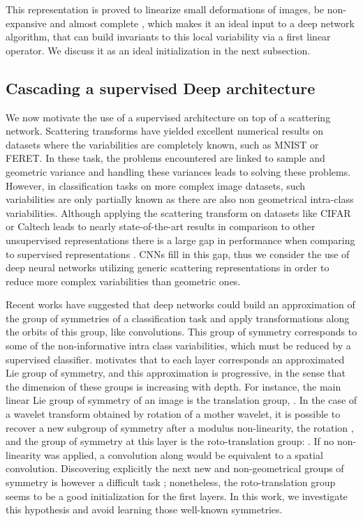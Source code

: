 \documentclass[10pt,twocolumn,letterpaper]{article}
\newcommand{\citep}{\cite}
\begin{document}
This representation is proved to linearize small deformations \cite{mallat2012group} of images, be non-expansive and almost complete \cite{dokmanic2016inverse,bruna2013audio}, which makes it an ideal input to a deep network algorithm, that can build invariants to this local variability via a first linear operator. We discuss it as an ideal initialization in the next subsection.  

\subsection{Cascading a supervised Deep architecture}
We now motivate the use of a supervised architecture on top of a scattering network. 
Scattering transforms have yielded excellent numerical results \cite{bruna2013invariant} on datasets where the variabilities are completely known, such as MNIST or FERET. In these task, the problems encountered are linked to sample and geometric variance and handling these variances leads to solving these problems. However, in classification tasks on more complex image datasets, such variabilities are only partially known as there are also non geometrical intra-class variabilities. Although applying the scattering transform on datasets like CIFAR or Caltech leads to nearly state-of-the-art results in comparison to other unsupervised representations there is a large gap in performance when comparing to supervised representations \cite{oyallon2015deep}. CNNs fill in this gap, thus we consider the use of deep neural networks utilizing generic scattering representations in order to reduce more complex variabilities than geometric ones.





 Recent works \citep{mallat2016understanding,bruna2013learning,jacobsen2017multiscale} have suggested that  deep networks could  build an approximation of the group of symmetries of a classification task and apply transformations along the orbits of this group, like convolutions. This group of symmetry corresponds to some of the non-informative intra class variabilities, which must be reduced by a supervised classifier. \citep{mallat2016understanding} motivates that to each layer corresponds an approximated Lie group of symmetry, and this approximation is progressive, in the sense that the dimension of these groups is increasing with depth. For instance, the main linear Lie group of symmetry of an image is the translation group, . In the case of a wavelet transform obtained by rotation of a mother wavelet, it is possible to recover a new subgroup of symmetry after a modulus non-linearity, the rotation , and the group of symmetry at this layer is the roto-translation group: . If no non-linearity was applied, a convolution along  would be equivalent to a spatial convolution. Discovering explicitly the next new and non-geometrical groups of symmetry is however a difficult task \cite{jacobsen2017multiscale}; nonetheless, the roto-translation group seems to be a good initialization for the first layers. In this work, we investigate this hypothesis and avoid learning those well-known symmetries.
\end{document}
